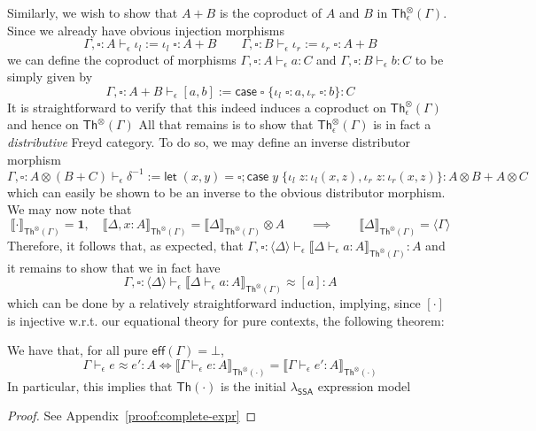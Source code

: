 \documentclass[acmsmall,screen,review]{acmart}
\newcommand{\mb}[1]{\ensuremath{\mathbf{#1}}}
\newcommand{\ms}[1]{\ensuremath{\mathsf{#1}}}
\newcommand{\lto}{:}
\newcommand{\linl}[1]{\iota_l\;{#1}}
\newcommand{\linr}[1]{\iota_r\;{#1}}
\newcommand{\caseexpr}[5]{\ms{case}\;#1\;\{\linl{#2} \lto #3, \linr{#4} \lto #5\}}
\newcommand{\bhyp}[2]{#1 : #2}
\newcommand{\hasty}[4]{#1 \vdash_{#2} #3: {#4}}
\newcommand{\teqv}{\approx}
\newcommand{\tmeq}[5]{#1 \vdash_{#2} #3 \teqv #4 : {#5}}
\newcommand{\dnt}[1]{\llbracket{#1}\rrbracket}
\newcommand{\invar}{\square}
\newcommand{\pckd}[1]{\langle #1 \rangle}
\newcommand{\isotopessa}{\(\lambda_{\ms{SSA}}\)}
\begin{document}
Similarly, we wish to show that $A + B$ is the coproduct of $A$ and $B$ in
$\ms{Th}_\epsilon^\otimes(\Gamma)$. Since we already have obvious injection morphisms
\begin{equation}
  \hasty{\Gamma, \invar : A}{\epsilon}{\iota_l := \iota_l\;\invar}{A + B} \qquad
  \hasty{\Gamma, \invar : B}{\epsilon}{\iota_r := \iota_r\;\invar}{A + B}
\end{equation}
we can define the coproduct of morphisms $\hasty{\Gamma, \invar : A}{\epsilon}{a}{C}$ and 
$\hasty{\Gamma, \invar : B}{\epsilon}{b}{C}$ to be simply given by
\begin{equation}
  \hasty{\Gamma, \invar : A + B}{\epsilon}{[a, b] := \caseexpr{\invar}{\invar}{a}{\invar}{b}}{C}
\end{equation}
It is straightforward to verify that this indeed induces a coproduct on
$\ms{Th}_\epsilon^\otimes(\Gamma)$ and hence on $\ms{Th}^\otimes(\Gamma)$ All that remains is to
show that $\ms{Th}_\epsilon^\otimes(\Gamma)$ is in fact a \emph{distributive} Freyd category. To do
so, we may define an inverse distributor morphism
\begin{equation}
  \hasty{\Gamma, \invar : A \otimes (B + C)}
    {\epsilon}
    {\delta^{-1} := \ms{let}\;(x, y) = \invar; \caseexpr{y}{z}{\iota_l(x, z)}{z}{\iota_r(x, z)}}
    {A \otimes B + A \otimes C}
\end{equation}
which can easily be shown to be an inverse to the obvious distributor morphism. We may now note that
\begin{equation}
  \dnt{\cdot}_{\ms{Th}^\otimes(\Gamma)} = \mb{1}, \quad
  \dnt{\Delta, \bhyp{x}{A}}_{\ms{Th}^\otimes(\Gamma)} 
    = \dnt{\Delta}_{\ms{Th}^\otimes(\Gamma)} \otimes A
  \qquad \implies \qquad
  \dnt{\Delta}_{\ms{Th}^\otimes(\Gamma)} = \pckd{\Gamma}
\end{equation}
Therefore, it follows that, as expected, that
$
  \hasty{\Gamma, \invar : \pckd{\Delta}}{\epsilon}
          {\dnt{\hasty{\Delta}{\epsilon}{a}{A}}_{\ms{Th}^\otimes(\Gamma)}}{A}
$
and it remains to show that we in fact have
$$
  \tmeq{\Gamma, \invar : \pckd{\Delta}}{\epsilon}
        {\dnt{\hasty{\Delta}{\epsilon}{a}{A}}_{\ms{Th}^\otimes(\Gamma)}}{[a]}{A}
$$
which can be done by a relatively straightforward induction, implying, since $[\cdot]$ is injective
w.r.t. our equational theory for pure contexts, the following theorem:
\begin{theorem}[name=Completeness (Expressions), restate=completenessexpr]
  We have that, for all pure $\ms{eff}(\Gamma) = \bot$,
  $$
    \tmeq{\Gamma}{\epsilon}{e}{e'}{A} 
    \iff \dnt{\hasty{\Gamma}{\epsilon}{e}{A}}_{\ms{Th}^\otimes(\cdot)} 
         = \dnt{\hasty{\Gamma}{\epsilon}{e'}{A}}_{\ms{Th}^\otimes(\cdot)}
  $$
  In particular, this implies that $\ms{Th}(\cdot)$ is the initial \isotopessa{} expression model
  \label{thm:complete-expr}
\end{theorem}
\begin{proof}
  See Appendix~\ref{proof:complete-expr}
\end{proof}
\end{document}
